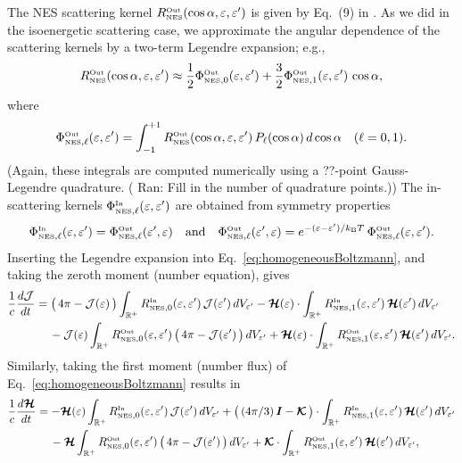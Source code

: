 \documentclass[10pt,preprint]{aastex}
\newcommand{\ee}[1]{{\color{red} #1}}
\newcommand{\NES}{\mbox{\tiny NES}}
\begin{document}
The NES scattering kernel $R_{\NES}^{\Out}(\cos\alpha,\epsilonNu,\epsilonNu')$ is given by Eq.~(9) in \citet{mezzacappaBruenn_1993c}.  
As we did in the isoenergetic scattering case, we approximate the angular dependence of the scattering kernels by a two-term Legendre expansion; e.g.,
\begin{equation}
  R^{\Out}_{\NES}(\cos\alpha,\epsilonNu,\epsilonNu') 
  \approx \f{1}{2} \Phi_{\NES,0}^{\Out}(\epsilonNu,\epsilonNu') + \f{3}{2}\Phi^{\Out}_{\NES,1}(\epsilonNu,\epsilonNu')\,\cos\alpha,
\end{equation}
where
\begin{equation}
  \Phi_{\NES,\ell}^{\Out}(\epsilonNu,\epsilonNu')
  =\int_{-1}^{+1}R_{\NES}^{\Out}(\cos\alpha,\epsilonNu,\epsilonNu')\,P_{\ell}(\cos\alpha)\,d\cos\alpha \quad (\ell=0,1).  
\end{equation}
(Again, these integrals are computed numerically using a ??-point Gauss-Legendre quadrature.  (\ee{Ran: Fill in the number of quadrature points}.))
The in-scattering kernels $\Phi_{\NES,\ell}^{\In}(\epsilonNu,\epsilonNu')$ are obtained from symmetry properties \citep{cernohorsky_1994}
\begin{equation}
  \Phi_{\NES,\ell}^{\In}(\epsilonNu,\epsilonNu')=\Phi_{\NES,\ell}^{\Out}(\epsilonNu',\epsilonNu)
  \quad\text{and}\quad
  \Phi_{\NES,\ell}^{\Out}(\epsilonNu',\epsilonNu)
  =e^{-(\epsilonNu-\epsilonNu')/k_{\mbox{\tiny B}}T}\,\Phi_{\NES,\ell}^{\Out}(\epsilonNu,\epsilonNu').
  \label{eq:symmetryNES}
\end{equation}
Inserting the Legendre expansion into Eq.~\eqref{eq:homogeneousBoltzmann}, and taking the zeroth moment (number equation), gives
\begin{align}
  \f{1}{c}\deriv{\cJ}{t}
  &=\big(\,4\pi-\cJ(\epsilonNu)\,\big)\int_{\bbR^{+}}R_{\NES,0}^{\In}(\epsilonNu,\epsilonNu')\,\cJ(\epsilonNu')\,dV_{\epsilonNu'}
  -\bcH(\epsilonNu)\cdot\int_{\bbR^{+}}R_{\NES,1}^{\In}(\epsilonNu,\epsilonNu')\,\bcH(\epsilonNu')\,dV_{\epsilonNu'} \nonumber \\
  & \hspace{12pt}
  -\cJ(\epsilonNu)\int_{\bbR^{+}}R_{\NES,0}^{\Out}(\epsilonNu,\epsilonNu')\,\big(\,4\pi-\cJ(\epsilonNu')\,\big)\,dV_{\epsilonNu'}
  +\bcH(\epsilonNu)\cdot\int_{\bbR^{+}}R_{\NES,1}^{\Out}(\epsilonNu,\epsilonNu')\,\bcH(\epsilonNu')\,dV_{\epsilonNu'}.  
\end{align}
Similarly, taking the first moment (number flux) of Eq.~\eqref{eq:homogeneousBoltzmann} results in
\begin{align}
  \f{1}{c}\deriv{\bcH}{t}
  &=-\bcH(\epsilonNu)\int_{\bbR^{+}}R_{\NES,0}^{\In}(\epsilonNu,\epsilonNu')\,\cJ(\epsilonNu')\,dV_{\epsilonNu'}
  +\big(\,(4\pi/3)\,\bI-\bcK\,\big)\cdot\int_{\bbR^{+}}R_{\NES,1}^{\In}(\epsilonNu,\epsilonNu')\,\bcH(\epsilonNu')\,dV_{\epsilonNu'} \nonumber \\
  & \hspace{12pt}
  -\bcH\int_{\bbR^{+}}R_{\NES,0}^{\Out}(\epsilonNu,\epsilonNu')\,\big(\,4\pi-\cJ(\epsilonNu')\,\big)\,dV_{\epsilonNu'}
  +\bcK\cdot\int_{\bbR^{+}}R_{\NES,1}^{\Out}(\epsilonNu,\epsilonNu')\,\bcH(\epsilonNu')\,dV_{\epsilonNu'},
\end{align}
\end{document}
